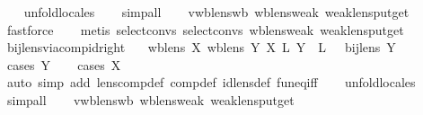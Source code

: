 \begin{isabellebody}
\ \ \isamarkupfalse%
\ {\isacharparenleft}unfold{\isacharunderscore}locales{\isacharparenright}\isanewline
\ \ \isamarkupfalse%
\ {\isacharparenleft}simp{\isacharunderscore}all{\isacharparenright}\isanewline
\ \ \isamarkupfalse%
\ vwb{\isacharunderscore}lens{\isacharunderscore}wb\ wb{\isacharunderscore}lens{\isacharunderscore}weak\ weak{\isacharunderscore}lens{\isachardot}put{\isacharunderscore}get\ \isamarkupfalse%
\ fastforce\isanewline
\ \ \isamarkupfalse%
\ {\isacharparenleft}metis\ select{\isacharunderscore}convs{\isacharparenleft}{}{\isacharparenright}\ select{\isacharunderscore}convs{\isacharparenleft}{}{\isacharparenright}\ wb{\isacharunderscore}lens{\isacharunderscore}weak\ weak{\isacharunderscore}lens{\isachardot}put{\isacharunderscore}get{\isacharparenright}\isanewline
{}\isamarkupfalse%
%
\endisatagproof
{\isafoldproof}%
%
\isadelimproof
\isanewline
%
\endisadelimproof
\isanewline
{}\isamarkupfalse%
\ bij{\isacharunderscore}lens{\isacharunderscore}via{\isacharunderscore}comp{\isacharunderscore}id{\isacharunderscore}right{\isacharcolon}\isanewline
\ \ {\isachardoublequoteopen}{\isasymlbrakk}\ wb{\isacharunderscore}lens\ X{\isacharsemicolon}\ wb{\isacharunderscore}lens\ Y{\isacharsemicolon}\ X\ {\isacharsemicolon}\isactrlsub L\ Y\ {\isacharequal}\ {}\isactrlsub L\ {\isasymrbrakk}\ {\isasymLongrightarrow}\ bij{\isacharunderscore}lens\ Y{\isachardoublequoteclose}\isanewline
%
\isadelimproof
\ \ %
\endisadelimproof
%
\isatagproof
{}\isamarkupfalse%
\ {\isacharparenleft}cases\ Y{\isacharparenright}\isanewline
\ \ \isamarkupfalse%
\ {\isacharparenleft}cases\ X{\isacharparenright}\isanewline
\ \ \isamarkupfalse%
\ {\isacharparenleft}auto\ simp\ add{\isacharcolon}\ lens{\isacharunderscore}comp{\isacharunderscore}def\ comp{\isacharunderscore}def\ id{\isacharunderscore}lens{\isacharunderscore}def\ fun{\isacharunderscore}eq{\isacharunderscore}iff{\isacharparenright}\isanewline
\ \ \isamarkupfalse%
\ {\isacharparenleft}unfold{\isacharunderscore}locales{\isacharparenright}\isanewline
\ \ \isamarkupfalse%
\ {\isacharparenleft}simp{\isacharunderscore}all{\isacharparenright}\isanewline
\ \ \isamarkupfalse%
\ vwb{\isacharunderscore}lens{\isacharunderscore}wb\ wb{\isacharunderscore}lens{\isacharunderscore}weak\ weak{\isacharunderscore}lens{\isachardot}put{\isacharunderscore}get\ \isamarkupfalse%

\end{isabellebody}
